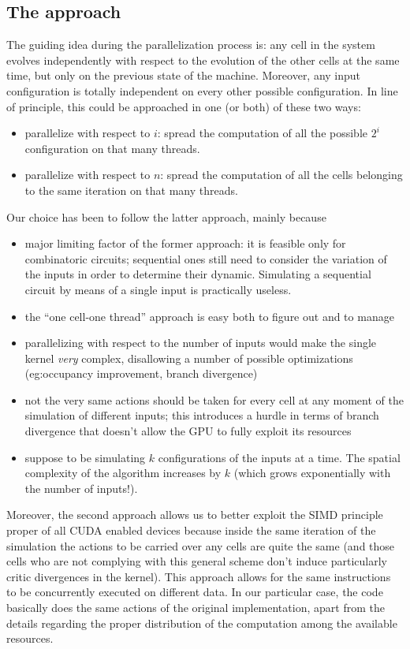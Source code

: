 \subsection{The approach}
The guiding idea during the parallelization process is: any cell in the system evolves independently with respect to the evolution of the other cells at the same time, but only on the previous state of the machine. Moreover, any input configuration is totally independent on every other possible configuration. In line of principle, this could be approached in one (or both) of these two ways:
\begin{itemize}
\item parallelize with respect to $i$: spread the computation of all the possible $2^i$ configuration on that many threads.
\item parallelize with respect to $n$: spread the computation of all the cells belonging to the same iteration on that many threads.
\end{itemize}
Our choice has been to follow the latter approach, mainly because 
\begin{itemize}
\item major limiting factor of the former approach: it is feasible only for combinatoric circuits; sequential ones still need to consider the variation of the inputs in order to determine their dynamic. Simulating a sequential circuit by means of a single input is practically useless.
\item the ``one cell-one thread'' approach is easy both to figure out and to manage
\item parallelizing with respect to the number of inputs would make the single kernel \textsl{very} complex, disallowing a number of possible optimizations (eg:occupancy improvement, branch divergence)  
\item not the very same actions should be taken for every cell at any moment of the simulation of different inputs; this introduces a hurdle in terms of branch divergence that doesn't allow the GPU to fully exploit its resources
\item suppose to be simulating $k$ configurations of the inputs at a time. The spatial complexity of the algorithm increases by $k$ (which grows exponentially with the number of inputs!).
\end{itemize} 

Moreover, the second approach allows us to better exploit the SIMD principle proper of all CUDA enabled devices because inside the same iteration of the simulation the actions to be carried over any cells are quite the same (and those cells who are not complying with this general scheme don't induce particularly critic divergences in the kernel). This approach allows for the same instructions to be concurrently executed on different data. In our particular case, the code basically does the same actions of the original implementation, apart from the details regarding the proper distribution of the computation among the available resources.

